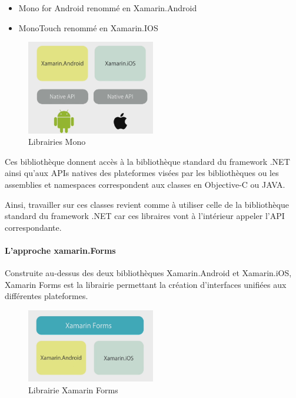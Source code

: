 \documentclass[11]{article}
\begin{document}
\begin{itemize}
\item Mono for Android renommé en Xamarin.Android
\item MonoTouch renommé en  Xamarin.IOS
\end{itemize}

\begin{figure}[h]
    \centering
    \includegraphics[width=0.5\textwidth]{lib-mono}
    \caption{Librairies Mono}
    \label{bat}
\end{figure}


 \vspace{0.5cm}
 
Ces bibliothèque donnent accès à la bibliothèque standard du framework .NET ainsi qu’aux APIs natives des plateformes visées par les bibliothèques ou les assemblies et namespaces correspondent aux classes en Objective-C ou JAVA.
 
 \vspace{0.5cm}
 
Ainsi, travailler sur ces classes revient comme à utiliser celle de la bibliothèque standard du framework .NET car ces libraires vont à l’intérieur appeler l’API correspondante.


\paragraph{L’approche xamarin.Forms}
Construite au-dessus des deux bibliothèques Xamarin.Android et Xamarin.iOS, Xamarin Forms est la librairie permettant la création d’interfaces unifiées aux différentes plateformes.

\begin{figure}[h]
    \centering
    \includegraphics[width=0.5\textwidth]{lib-xamforms}
    \caption{Librairie Xamarin Forms}
    \label{bat}
\end{figure}
\end{document}
